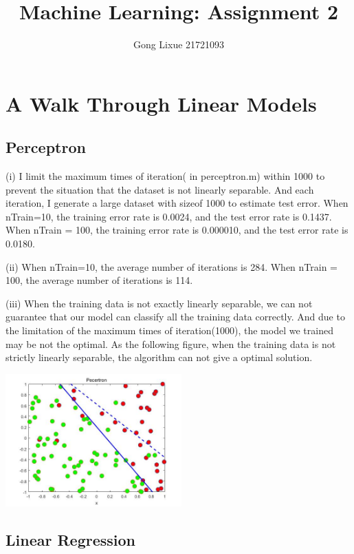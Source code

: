 \documentclass[11pt]{article} %
\title{Machine Learning: Assignment 2}
\author{Gong Lixue 21721093}
\begin{document}
\maketitle

\section{A Walk Through Linear Models}

\subsection{Perceptron}


(i) I limit the maximum times of iteration( in perceptron.m) within 1000 to prevent the situation that the dataset is not linearly separable. And each iteration, I generate a large dataset with sizeof 1000 to estimate test error.
When nTrain=10, the training error rate is 0.0024, and the test error rate is 0.1437. 
When nTrain = 100, the training error rate is 0.000010, and the test error rate is 0.0180. 

(ii) When nTrain=10, the average number of iterations is 284.
When nTrain = 100, the average number of iterations is 114.

(iii) When the training data is not exactly linearly separable, we can not guarantee that our model can classify all the training data correctly. And due to the limitation of the maximum times of iteration(1000), the model we trained may be not the optimal. As the following figure, when the training data is not strictly linearly separable, the algorithm can not give a optimal solution.

\begin{center}
\includegraphics[height=2in]{./Perceptron_nonlinear.jpg}
\end{center}

\subsection{Linear Regression}
\end{document}
